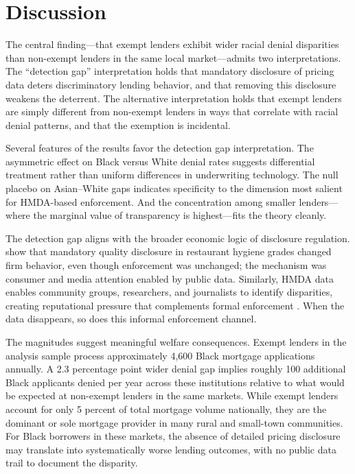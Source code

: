 \documentclass[12pt]{article}
\begin{document}
\section{Discussion}

The central finding---that exempt lenders exhibit wider racial denial disparities than non-exempt lenders in the same local market---admits two interpretations. The ``detection gap'' interpretation holds that mandatory disclosure of pricing data deters discriminatory lending behavior, and that removing this disclosure weakens the deterrent. The alternative interpretation holds that exempt lenders are simply different from non-exempt lenders in ways that correlate with racial denial patterns, and that the exemption is incidental.

Several features of the results favor the detection gap interpretation. The asymmetric effect on Black versus White denial rates suggests differential treatment rather than uniform differences in underwriting technology. The null placebo on Asian--White gaps indicates specificity to the dimension most salient for HMDA-based enforcement. And the concentration among smaller lenders---where the marginal value of transparency is highest---fits the theory cleanly.

The detection gap aligns with the broader economic logic of disclosure regulation. \citet{jin2003role} show that mandatory quality disclosure in restaurant hygiene grades changed firm behavior, even though enforcement was unchanged; the mechanism was consumer and media attention enabled by public data. Similarly, HMDA data enables community groups, researchers, and journalists to identify disparities, creating reputational pressure that complements formal enforcement \citep{bhutta2015effects, ambrose2021real}. When the data disappears, so does this informal enforcement channel.

The magnitudes suggest meaningful welfare consequences. Exempt lenders in the analysis sample process approximately 4,600 Black mortgage applications annually. A 2.3 percentage point wider denial gap implies roughly 100 additional Black applicants denied per year across these institutions relative to what would be expected at non-exempt lenders in the same markets. While exempt lenders account for only 5 percent of total mortgage volume nationally, they are the dominant or sole mortgage provider in many rural and small-town communities. For Black borrowers in these markets, the absence of detailed pricing disclosure may translate into systematically worse lending outcomes, with no public data trail to document the disparity.
\end{document}
